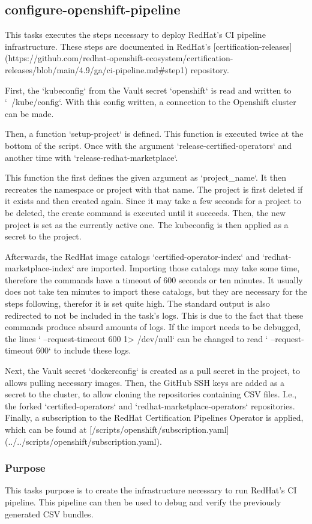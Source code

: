 \subsection{configure-openshift-pipeline}\label{subsec:configure-openshift-pipeline}

This tasks executes the steps necessary to deploy RedHat's CI pipeline infrastructure.
These steps are documented in RedHat's [certification-releases](https://github.com/redhat-openshift-ecosystem/certification-releases/blob/main/4.9/ga/ci-pipeline.md#step1) repository.

First, the `kubeconfig` from the Vault secret `openshift` is read and written to `~/kube/config`.
With this config written, a connection to the Openshift cluster can be made.

Then, a function `setup-project` is defined.
This function is executed twice at the bottom of the script.
Once with the argument `release-certified-operators` and another time with `release-redhat-marketplace`.

This function the first defines the given argument as `project_name`.
It then recreates the namespace or project with that name.
The project is first deleted if it exists and then created again.
Since it may take a few seconds for a project to be deleted, the create command is executed until it succeeds.
Then, the new project is set as the currently active one.
The kubeconfig is then applied as a secret to the project.

Afterwards, the RedHat image catalogs `certified-operator-index` and `redhat-marketplace-index` are imported.
Importing those catalogs may take some time, therefore the commands have a timeout of 600 seconds or ten minutes.
It usually does not take ten minutes to import these catalogs, but they are necessary for the steps following, therefor it is set quite high.
The standard output is also redirected to not be included in the task's logs.
This is due to the fact that these commands produce absurd amounts of logs.
If the import needs to be debugged, the lines `    --request-timeout 600 1> /dev/null` can be changed to read `    --request-timeout 600` to include these logs.

Next, the Vault secret `dockerconfig` is created as a pull secret in the project, to allows pulling necessary images.
Then, the GitHub SSH keys are added as a secret to the cluster, to allow cloning the repositories containing CSV files.
I.e., the forked `certified-operators` and `redhat-marketplace-operators` repositories.
Finally, a subscription to the RedHat Certification Pipelines Operator is applied, which can be found at [/scripts/openshift/subscription.yaml](../../scripts/openshift/subscription.yaml).

\subsubsection{Purpose}\label{subsubsec:cop-Purpose}

This tasks purpose is to create the infrastructure necessary to run RedHat's CI pipeline.
This pipeline can then be used to debug and verify the previously generated CSV bundles.
